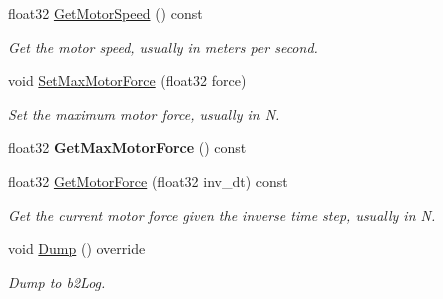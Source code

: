 \begin{DoxyCompactItemize}
\mbox{\label{classb2PrismaticJoint_a869c6edeb62ed01237b2adb09da273ae}} 
float32 \hyperlink{classb2PrismaticJoint_a869c6edeb62ed01237b2adb09da273ae}{Get\+Motor\+Speed} () const
\begin{DoxyCompactList}\small\item\em Get the motor speed, usually in meters per second. \end{DoxyCompactList}\item 
\mbox{\label{classb2PrismaticJoint_aa7817474aef15ca4815341479ac590e2}} 
void \hyperlink{classb2PrismaticJoint_aa7817474aef15ca4815341479ac590e2}{Set\+Max\+Motor\+Force} (float32 force)
\begin{DoxyCompactList}\small\item\em Set the maximum motor force, usually in N. \end{DoxyCompactList}\item 
\mbox{\label{classb2PrismaticJoint_aea8d0701bdf00a38fd2f24d94ae74842}} 
float32 {\bfseries Get\+Max\+Motor\+Force} () const
\item 
\mbox{\label{classb2PrismaticJoint_aaf7a7fe2300d9fe7a810306e9cfbb41a}} 
float32 \hyperlink{classb2PrismaticJoint_aaf7a7fe2300d9fe7a810306e9cfbb41a}{Get\+Motor\+Force} (float32 inv\+\_\+dt) const
\begin{DoxyCompactList}\small\item\em Get the current motor force given the inverse time step, usually in N. \end{DoxyCompactList}\item 
\mbox{\label{classb2PrismaticJoint_a843ddb0f912085f3deb3ee7320d7ddc7}} 
void \hyperlink{classb2PrismaticJoint_a843ddb0f912085f3deb3ee7320d7ddc7}{Dump} () override
\begin{DoxyCompactList}\small\item\em Dump to b2\+Log. \end{DoxyCompactList}\end{DoxyCompactItemize}
